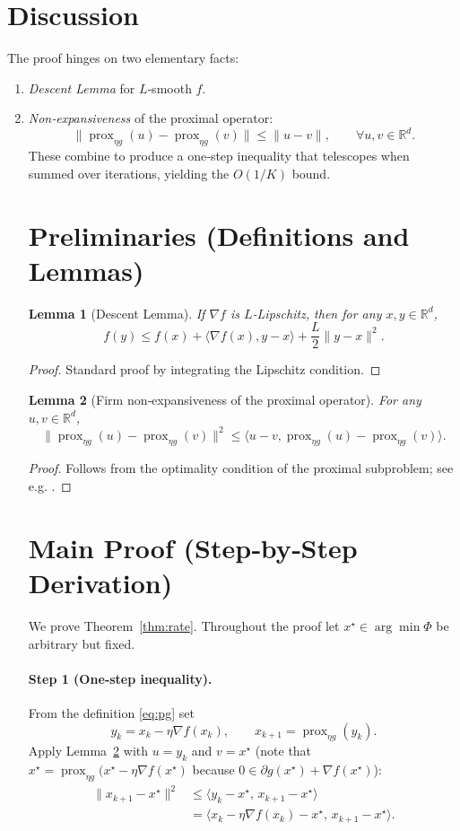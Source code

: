 \documentclass{article}
\newtheorem{lemma}{Lemma}
\newcommand{\prox}{\operatorname{prox}}
\newcommand{\R}{\mathbb{R}}
\begin{document}
\section*{Discussion}
The proof hinges on two elementary facts:
\begin{enumerate}
\item \emph{Descent Lemma} for $L$‑smooth $f$.
\item \emph{Non‑expansiveness} of the proximal operator:
\[
\|\prox_{\eta g}(u)-\prox_{\eta g}(v)\|\le\|u-v\|,\qquad\forall u,v\in\R^{d}.
\]
These combine to produce a one‑step inequality that telescopes when summed over iterations, yielding the $O(1/K)$ bound.

\newpage
\section*{Preliminaries (Definitions and Lemmas)}
\begin{lemma}[Descent Lemma]\label{lem:descent}
If $\nabla f$ is $L$‑Lipschitz, then for any $x,y\in\R^{d}$,
\[
f(y)\le f(x)+\langle\nabla f(x),y-x\rangle+\frac{L}{2}\|y-x\|^{2}.
\]
\end{lemma}
\begin{proof}
Standard proof by integrating the Lipschitz condition. \qedhere
\end{proof}

\begin{lemma}[Firm non‑expansiveness of the proximal operator]\label{lem:firm}
For any $u,v\in\R^{d}$,
\[
\|\prox_{\eta g}(u)-\prox_{\eta g}(v)\|^{2}
\le\langle u-v,\prox_{\eta g}(u)-\prox_{\eta g}(v)\rangle .
\]
\end{lemma}
\begin{proof}
Follows from the optimality condition of the proximal subproblem; see e.g. \cite{parikh2014proximal}. \qedhere
\end{proof}

\section*{Main Proof (Step‑by‑Step Derivation)}
We prove Theorem~\ref{thm:rate}. Throughout the proof let $x^{\star}\in\arg\min\Phi$ be arbitrary but fixed.

\paragraph{Step 1 (One‑step inequality).}
From the definition \eqref{eq:pg} set
\[
y_{k}=x_{k}-\eta\nabla f(x_{k}),\qquad x_{k+1}=\prox_{\eta g}(y_{k}).
\]
Apply Lemma~\ref{lem:firm} with $u=y_{k}$ and $v=x^{\star}$ (note that $x^{\star}=\prox_{\eta g}(x^{\star}-\eta\nabla f(x^{\star})$ because $0\in\partial g(x^{\star})+\nabla f(x^{\star})$):
\begin{align}
\|x_{k+1}-x^{\star}\|^{2}
&\le\langle y_{k}-x^{\star},\,x_{k+1}-x^{\star}\rangle \nonumber\\
&=\langle x_{k}-\eta\nabla f(x_{k})-x^{\star},\,x_{k+1}-x^{\star}\rangle . \tag{Step 1}
\end{align}


\end{enumerate}
\end{document}
